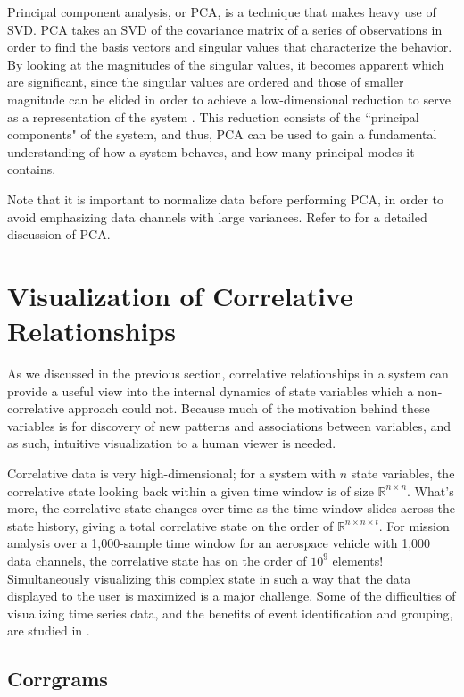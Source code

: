 Principal component analysis, or PCA, is a technique that makes heavy use of SVD. PCA takes an SVD of the covariance matrix of a series of observations in order to find the basis vectors and singular values that characterize the behavior. By looking at the magnitudes of the singular values, it becomes apparent which are significant, since the singular values are ordered and those of smaller magnitude can be elided in order to achieve a low-dimensional reduction to serve as a representation of the system \cite{kutz2013data}. This reduction consists of the ``principal components" of the system, and thus, PCA can be used to gain a fundamental understanding of how a system behaves, and how many principal modes it contains.

Note that it is important to normalize data before performing PCA, in order to avoid emphasizing data channels with large variances. Refer to \cite{shlens2014tutorial} for a detailed discussion of PCA.


\section{Visualization of Correlative Relationships}

As we discussed in the previous section, correlative relationships in a system can provide a useful view into the internal dynamics of state variables which a non-correlative approach could not. Because much of the motivation behind these variables is for discovery of new patterns and associations between variables, and as such, intuitive visualization to a human viewer is needed.

Correlative data is very high-dimensional; for a system with $n$ state variables, the correlative state looking back within a given time window is of size $\mathbb{R}^{n \times n}$. What's more, the correlative state changes over time as the time window slides across the state history, giving a total correlative state on the order of $\mathbb{R}^{n \times n \times t}$. For mission analysis over a 1,000-sample time window for an aerospace vehicle with 1,000 data channels, the correlative state has on the order of $10^{9}$ elements! Simultaneously visualizing this complex state in such a way that the data displayed to the user is maximized is a major challenge. Some of the difficulties of visualizing time series data, and the benefits of event identification and grouping, are studied in \cite{muller2003visualization}.

\subsection{Corrgrams}

